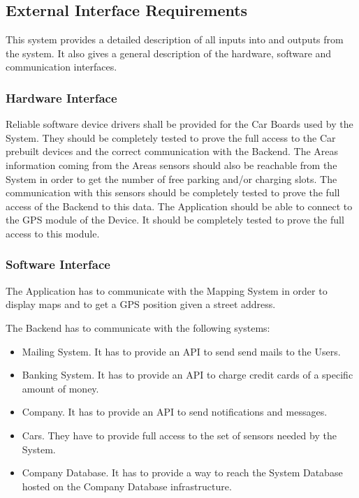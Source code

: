 \subsection{External Interface Requirements}
This system provides a detailed description of all inputs into and outputs from the system. It also gives a general description of the hardware, software and communication interfaces.

\subsubsection{Hardware Interface}
Reliable software device drivers shall be provided for the Car Boards used by the System. They should be completely tested to prove the full access to the Car prebuilt devices and the correct communication with the Backend. 
The Areas information coming from the Areas sensors should also be reachable from the System in order to get the number of free parking and/or charging slots. The communication with this sensors should be completely tested to prove the full access of the Backend to this data.
The Application should be able to connect to the GPS module of the Device. It should be completely tested to prove the full access to this module. 

\subsubsection{Software Interface}
The Application has to communicate with the Mapping System in order to display maps and to get a GPS position given a street address.

The Backend has to communicate with the following systems:
\begin{itemize}
	\item Mailing System. It has to provide an API to send send mails to the Users. 
	\item Banking System. It has to provide an API to charge credit cards of a specific amount of money.
	\item Company. It has to provide an API to send notifications and messages.
	\item Cars. They have to provide full access to the set of sensors needed by the System.
	\item Company Database. It has to provide a way to reach the System Database hosted on the Company Database infrastructure.
\end{itemize}

